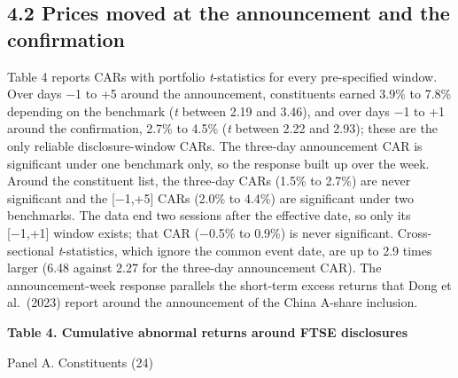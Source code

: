 \hypertarget{prices-moved-at-the-announcement-and-the-confirmation}{%
\subsection{4.2 Prices moved at the announcement and the
confirmation}\label{prices-moved-at-the-announcement-and-the-confirmation}}

Table 4 reports CARs with portfolio \emph{t}-statistics for every
pre-specified window. Over days −1 to +5 around the announcement,
constituents earned 3.9\% to 7.8\% depending on the benchmark (\emph{t}
between 2.19 and 3.46), and over days −1 to +1 around the confirmation,
2.7\% to 4.5\% (\emph{t} between 2.22 and 2.93); these are the only
reliable disclosure-window CARs. The three-day announcement CAR is
significant under one benchmark only, so the response built up over the
week. Around the constituent list, the three-day CARs (1.5\% to 2.7\%)
are never significant and the {[}−1,+5{]} CARs (2.0\% to 4.4\%) are
significant under two benchmarks. The data end two sessions after the
effective date, so only its {[}−1,+1{]} window exists; that CAR (−0.5\%
to 0.9\%) is never significant. Cross-sectional \emph{t}-statistics,
which ignore the common event date, are up to 2.9 times larger (6.48
against 2.27 for the three-day announcement CAR). The announcement-week
response parallels the short-term excess returns that Dong et al.~(2023)
report around the announcement of the China A-share inclusion.

\textbf{Table 4. Cumulative abnormal returns around FTSE disclosures}

Panel A. Constituents (24)

